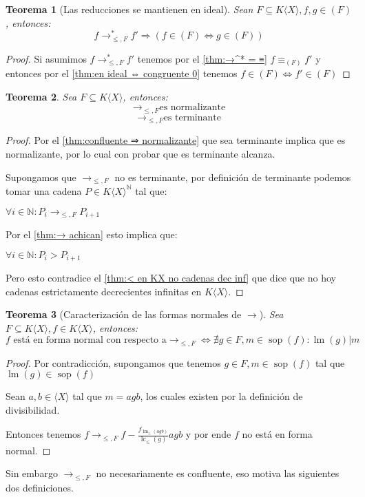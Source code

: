 \documentclass[fleqn]{amsbook} %
\theoremstyle{customstyle}
\newtheorem{theorem}{Teorema}[section]
\DeclareMathOperator{\sop}{sop}
\DeclareMathOperator{\lm}{lm}
\DeclareMathOperator{\lc}{lc}
\begin{document}
\begin{theorem}[Las reducciones se mantienen en ideal]\label{thm:→ mantiene pertenencia a ideal}
Sean $F ⊆ K⟨X⟩, f, g ∈ (F)$, entonces:
\[ f →^*_{≤, F} f' ⇒ (f ∈ (F) ⇔ g ∈ (F)) \]
\end{theorem}
\begin{proof}
Si asumimos $f →^*_{≤, F} f'$ tenemos por el \cref{thm:→^* = ≡} $f ≡_{(F)} f'$ y entonces por el \cref{thm:en ideal ⇔ congruente 0} tenemos $f ∈ (F) ⇔ f' ∈ (F)$
\end{proof}

\begin{theorem}
Sea $F ⊆ K⟨X⟩$, entonces:
\[ →_{≤, F} \text{es normalizante} \]
\[ →_{≤, F} \text{es terminante} \]
\end{theorem}
\begin{proof}
Por el \cref{thm:confluente ⇒ normalizante} que sea terminante implica que es normalizante, por lo cual con probar que es terminante alcanza.

Supongamos que $→_{≤, F}$ no es terminante, por definición de terminante podemos tomar una cadena $P ∈ K⟨X⟩^ℕ$ tal que:

$∀i ∈ ℕ : P_i →_{≤, F} P_{i+1}$

Por el \cref{thm:→ achican} esto implica que:

$∀i ∈ ℕ : P_i > P_{i+1}$

Pero esto contradice el \cref{thm:< en KX no cadenas dec inf} que dice que no hoy cadenas estrictamente decrecientes infinitas en $K⟨X⟩$.

\end{proof}

\begin{theorem}[Caracterización de las formas normales de $→$]
Sea $F ⊆ K⟨X⟩, f ∈ K⟨X⟩$, entonces: %
\[ f\text{ está en forma normal con respecto a} →_{≤, F} ⇔ ∄g ∈ F, m ∈ \sop(f) : \lm(g) | m \]
\end{theorem}
\begin{proof}
Por contradicción, supongamos que tenemos $g ∈ F, m ∈ \sop(f)$ tal que $\lm(g) ∈ \sop(f)$

Sean $a, b ∈ ⟨X⟩$ tal que $m = agb$, los cuales existen por la definición de divisibilidad.

Entonces tenemos $f →_{≤, F} f - \frac{f_{\lm_≤(agb)}}{\lc_≤(g)}agb$ y por ende $f$ no está en forma normal.

\end{proof}

Sin embargo $→_{≤, F}$ no necesariamente es confluente, eso motiva las siguientes dos definiciones.
\end{document}
